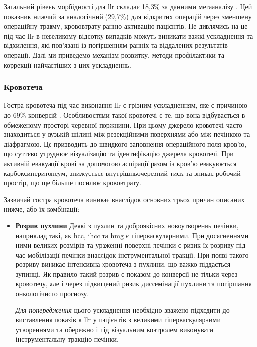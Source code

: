 \begin{refsection}
Загальний рівень морбідності для \acrshort{llr} складає 18,3\% за данними метааналізу \cite{Ciria2016a}. Цей показник нижчий за аналогічний (29,7\%) для відкритих операцій через зменшену операційну травму, крововтрату ранню активацію пацієнтів. Не дивлячись на це під час \acrshort{llr} в невеликому відсотку випадків можуть виникати важкі ускладнення та відхилення, які пов'язані із погіршенням ранніх та віддалених результатів операції. Далі ми приведемо механізм розвитку, методи профілактики та коррекції найчастіших з цих ускладненнь.  

\subsubsection{Кровотеча}

Гостра кровотеча під час виконання \acrshort{llr} є грізним ускладненням, яке є причиною до 69\% конверсій \cite{Michele2021}.  Особливостями такої кровотечі є те, що вона відбувається в обмеженому просторі черевної поржнини. При цьому джерело кровотечі часто знаходиться у вузькій шілині між резекційними поверхнями або між печінкою та діафрагмою. Це призводить до швидкого заповнення операційного поля кров'ю, що суттєво утруднює візуалізацію та ідентифікацію джерела кровотечі. При активній евакуації крові за допомогою аспірації разом із кров'ю евакуюється карбоксиперитонеум, знижується внутрішньочеревний тиск та зникає робочий простір, що ще більше посилює крововтрату. 

Зазвичай гостра кровотеча виникає внаслідок основних трьох причин описаних нижче, або їх комбінації:

\begin{itemize}
    \item \textbf{Розрив пухлини} Деякі з пухлин та доброякісних новоутвореннь печінки, наприклад такі, як \acrshort{hcc}, \acrshort{ihcc} та \acrshort{hmg} є гіперваскулярними. При досягненнями ними великих розмірів та ураженні поверхні печінки є ризик їх розриву під час мобілізації печінки внаслідок інструментальної тракції. При появі такого розриву виникає інтенсивна кровотеча з пухлини, що важко піддається зупинці. Як правило такий розрив є показом до конверсії не тільки через кровотечу, але і через підвищений ризик диссемінації пухлини та погіршання онкологічного прогнозу. 
    
    \textit{Для попередження} цього ускладнення необхідно зважено підходити до виставлення показів к \acrshort{llr} у пацієнтів з великими гіперваскулярними утвореннями та обережно і під візуальним контролем виконувати інструментальну тракцію печінки.
    

\end{itemize}
\end{refsection}
